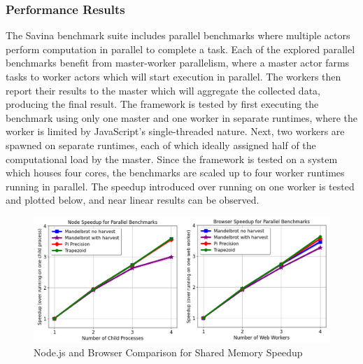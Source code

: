 \documentclass[oneside]{um-fict}
\begin{document}
\subsubsection{Performance Results}
The Savina benchmark suite includes parallel benchmarks where multiple actors perform computation in parallel to complete a task. Each of the explored parallel benchmarks benefit from master-worker parallelism, where a master actor farms tasks to worker actors which will start execution in parallel. The workers then report their results to the master which will aggregate the collected data, producing the final result. The framework is tested by first executing the benchmark using only one master and one worker in separate runtimes, where the worker is limited by JavaScript's single-threaded nature.  Next, two workers are spawned on separate runtimes, each of which ideally assigned half of the computational load by the master. Since the framework is tested on a system which houses four cores, the benchmarks are scaled up to four worker runtimes running in parallel. The speedup introduced over running on one worker is tested and plotted below, and near linear results can be observed.
\begin{figure}[H]
    \begin{centering}
        \includegraphics[width=\textwidth]{resources/shared_memory_speedup.png}
        \caption{Node.js and Browser Comparison for Shared Memory Speedup}\label{fig:shared_memory_speedup}
    \end{centering}
\end{figure}
\end{document}
